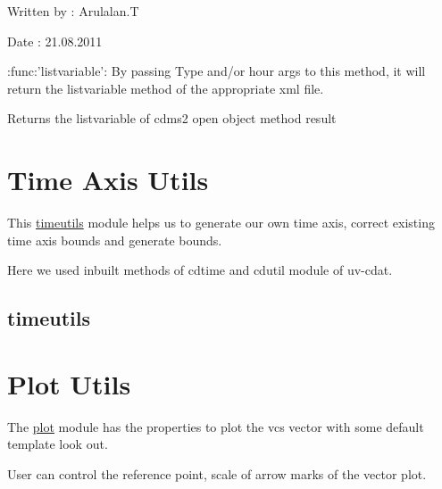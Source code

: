 \documentclass[letterpaper,10pt,english]{sphinxmanual}
\begin{document}
\begin{fulllineitems}
\begin{fulllineitems}
\begin{description}
\end{description}

Written by : Arulalan.T

Date : 21.08.2011

\end{fulllineitems}


\begin{fulllineitems}
\label{diagnosisutils:xml_data_access.GribXmlAccess.listvariable}
:func:'listvariable': By passing Type and/or hour args to this method,
it will return the listvariable method of the appropriate xml file.

Returns the listvariable of cdms2 open object method result

\end{fulllineitems}


\end{fulllineitems}



\section{Time Axis Utils}
\label{diagnosisutils:time-axis-utils}
This {\hyperref[diagnosisutils:timeutils]{timeutils}} module helps us to generate our own time axis, correct existing time axis bounds and generate bounds.

Here we used inbuilt methods of cdtime and cdutil module of uv-cdat.


\subsection{timeutils}
\label{diagnosisutils:module-timeutils}\label{diagnosisutils:timeutils}\label{diagnosisutils:module-timeutils}

\section{Plot Utils}
\label{diagnosisutils:plot-utils}
The {\hyperref[diagnosisutils:plot]{plot}} module has the properties to plot the vcs vector with some default template look out.

User can control the reference point, scale of arrow marks of the vector plot.
\end{document}
